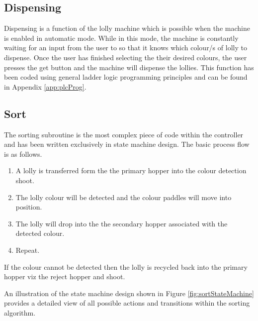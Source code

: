     \subsection{Dispensing}
        Dispensing is a function of the lolly machine which is possible when the machine is enabled in automatic mode. While in this mode, the machine is constantly waiting for an input from the user to so that it knows which colour/s of lolly to dispense. Once the user has finished selecting the their desired colours, the user presses the get button and the machine will dispense the lollies. This function has been coded using general ladder logic programming principles and can be found in Appendix \ref{app:plcProg}.
        
    \subsection{Sort}
        The sorting subroutine is the most complex piece of code within the controller and has been written exclusively in state machine design. The basic process flow is as follows. 

        \begin{enumerate}
            \item A lolly is transferred form the the primary hopper into the colour detection shoot.
            \item The lolly colour will be detected and the colour paddles will move into position.
            \item The lolly will drop into the the secondary hopper associated with the detected colour.
            \item Repeat.
        \end{enumerate}

        If the colour cannot be detected then the lolly is recycled back into the primary hopper viz the reject hopper and shoot. 

        An illustration of the state machine design shown in Figure \ref{fig:sortStateMachine} provides a detailed view of all possible actions and transitions within the sorting algorithm.



